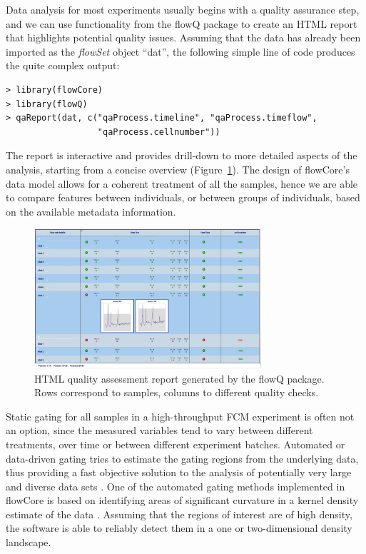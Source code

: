 \documentclass[12pt]{article}
\newcommand{\Rpackage}[1]{{\textsf{#1}}}
\newcommand{\Rclass}[1]{{\textit{#1}}}
\begin{document}
Data analysis for most experiments usually begins with a quality
assurance step, and we can use functionality from the \Rpackage{flowQ}
package to create an HTML report that highlights potential quality
issues. Assuming that the data has already been imported as the
\Rclass{flowSet} object ``dat'', the following simple line of code
produces the quite complex output:

\begin{verbatim}
> library(flowCore)
> library(flowQ)
> qaReport(dat, c("qaProcess.timeline", "qaProcess.timeflow", 
                  "qaProcess.cellnumber"))
\end{verbatim}

The report is interactive and provides drill-down to more detailed
aspects of the analysis, starting from a concise overview
(Figure~\ref{flowQ}). The design of \Rpackage{flowCore}'s data model
allows for a coherent treatment of all the samples, hence we are able
to compare features between individuals, or between groups of
individuals, based on the available metadata information.


\begin{figure}[htbp]
\centering
\includegraphics[width=0.75\textwidth]{flowQ.jpg}
\caption{\label{flowQ}%
  HTML quality assessment report generated by the flowQ package. Rows
  correspond to samples, columns to different quality checks.}
\end{figure}

Static gating for all samples in a high-throughput FCM experiment is
often not an option, since the measured variables tend to vary between
different treatments, over time or between different experiment
batches. Automated or data-driven gating tries to estimate the gating
regions from the underlying data, thus providing a fast objective
solution to the analysis of potentially very large and diverse data
sets \cite{lo2008agf}. One of the automated gating methods implemented
in \Rpackage{flowCore} is based on identifying areas of significant
curvature in a kernel density estimate of the data
\citep{wand2008}. Assuming that the regions of interest are of high
density, the software is able to reliably detect them in a one or
two-dimensional density landscape.
\end{document}
